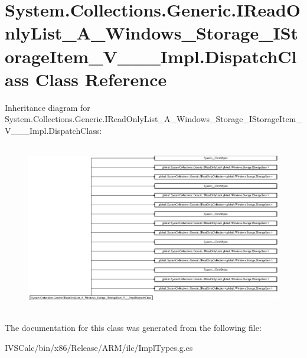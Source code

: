\hypertarget{class_system_1_1_collections_1_1_generic_1_1_i_read_only_list___a___windows___storage___i_storag588d840b759a67798aaf22ec1204f676}{}\section{System.\+Collections.\+Generic.\+I\+Read\+Only\+List\+\_\+\+A\+\_\+\+Windows\+\_\+\+Storage\+\_\+\+I\+Storage\+Item\+\_\+\+V\+\_\+\+\_\+\+\_\+\+Impl.\+Dispatch\+Class Class Reference}
\label{class_system_1_1_collections_1_1_generic_1_1_i_read_only_list___a___windows___storage___i_storag588d840b759a67798aaf22ec1204f676}
Inheritance diagram for System.\+Collections.\+Generic.\+I\+Read\+Only\+List\+\_\+\+A\+\_\+\+Windows\+\_\+\+Storage\+\_\+\+I\+Storage\+Item\+\_\+\+V\+\_\+\+\_\+\+\_\+\+Impl.\+Dispatch\+Class\+:\begin{figure}[H]
\begin{center}
\leavevmode
\includegraphics[height=7.466667cm]{class_system_1_1_collections_1_1_generic_1_1_i_read_only_list___a___windows___storage___i_storag588d840b759a67798aaf22ec1204f676}
\end{center}
\end{figure}


The documentation for this class was generated from the following file\+:\begin{DoxyCompactItemize}
\item 
I\+V\+S\+Calc/bin/x86/\+Release/\+A\+R\+M/ilc/Impl\+Types.\+g.\+cs\end{DoxyCompactItemize}
